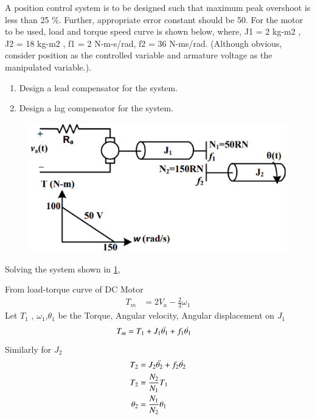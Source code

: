 \item A position control system is to be designed such that maximum peak overshoot is less than 25 \%.
Further, appropriate error constant should be 50. For the motor to be used, load and torque
speed curve is shown below, where, J1 = 2 kg-m2
, J2 = 18 kg-m2
, f1 = 2 N-m-s/rad, f2 = 36 N-ms/rad. (Although obvious, consider position as the controlled variable and armature voltage as
the manipulated variable.). 
\begin{enumerate}[label=(\roman*)]
\item Design a lead compensator for the system.
\item Design a lag compensator for the system.
\end{enumerate}

\begin{figure}[!ht]
\centering
    \includegraphics[width=\columnwidth]{./figs/ee18btech11001/ee18btech11001_1.eps}
  \caption{}
  \label{fig:ee18btech11001_fig1}
\end{figure}
%
\solution
Solving the system shown in \ref{fig:ee18btech11001_fig1},

From load-torque curve of DC Motor
\begin{align}
   T_{m} &=  2V_{a} - \frac{2}{3}\omega_{1}
    \label{eq:ee18btech11001_1}
\end{align}
Let $T_{1}$ , $\omega_{1}$,$\theta_1{}$  be the Torque, Angular velocity, Angular displacement on $J_{1}$
\begin{align}
    T_{m} &= T_{1} + J_{1}\Ddot{\theta_{1}} + f_{1}\Dot{\theta_{1}} 
    \label{eq:ee18btech11001_2}
\end{align}
Similarly for $J_{2}$
\begin{align}
    T_{2} &=  J_{2}\Ddot{\theta_{2}} + f_{2}\Dot{\theta_{2}} 
    \label{eq:ee18btech11001_3}
    \\
    T_{2} &= \frac{N_{2}}{N_{1}} T_{1} \label{eq:ee18btech11001_4}
    \\
    \theta_{2} &= \frac{N_{1}}{N_{2}} \theta_{1} \label{eq:ee18btech11001_5}
\end{align}
    
